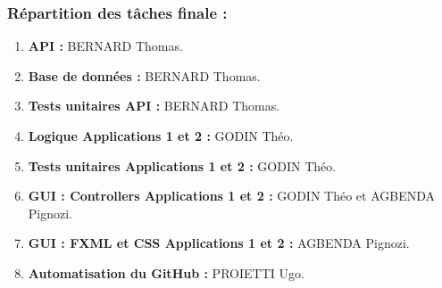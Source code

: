 \documentclass[../rapport.tex]{subfiles}
\begin{document}
	\subsubsection{Répartition des tâches finale :}
		\begin{enumerate}
			\item\textbf{API : } BERNARD Thomas.
			\item\textbf{Base de données : } BERNARD Thomas.
			\item\textbf{Tests unitaires API : } BERNARD Thomas.
			\item\textbf{Logique Applications 1 et 2 : } GODIN Théo.
			\item\textbf{Tests unitaires Applications 1 et 2 : } GODIN Théo.
			\item\textbf{GUI : Controllers Applications 1 et 2 : } GODIN Théo et AGBENDA Pignozi.
			\item\textbf{GUI : FXML et CSS Applications 1 et 2 : } AGBENDA Pignozi.
			\item\textbf{Automatisation du GitHub : } PROIETTI Ugo.
		\end{enumerate}

\newpage
\end{document}
